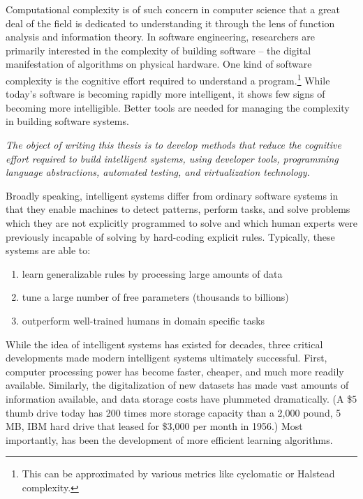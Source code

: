\documentclass[12pt,initial,twoside,maitrise]{dms}
\numberwithin{equation}{section}
\numberwithin{table}{chapter}
\numberwithin{figure}{chapter}
\begin{document}
Computational complexity is of such concern in computer science that a great deal of the field is dedicated to understanding it through the lens of function analysis and information theory. In software engineering, researchers are primarily interested in the complexity of building software -- the digital manifestation of algorithms on physical hardware. One kind of software complexity is the cognitive effort required to understand a program.\footnote{This can be approximated by various metrics like cyclomatic or Halstead complexity.} While today’s software is becoming rapidly more intelligent, it shows few signs of becoming more intelligible. Better tools are needed for managing the complexity in building software systems.

\textit{The object of writing this thesis is to develop methods that reduce the cognitive effort required to build intelligent systems, using developer tools, programming language abstractions, automated testing, and virtualization technology.}

Broadly speaking, intelligent systems differ from ordinary software systems in that they enable machines to detect patterns, perform tasks, and solve problems which they are not explicitly programmed to solve and which human experts were previously incapable of solving by hard-coding explicit rules. Typically, these systems are able to:\\
%
\begin{enumerate}
    \item learn generalizable rules by processing large amounts of data
    \item tune a large number of free parameters (thousands to billions)
    \item outperform well-trained humans in domain specific tasks
\end{enumerate}
%
While the idea of intelligent systems has existed for decades, three critical developments made modern intelligent systems ultimately successful. First, computer processing power has become faster, cheaper, and much more readily available. Similarly, the digitalization of new datasets has made vast amounts of information available, and data storage costs have plummeted dramatically. (A \$5 thumb drive today has 200 times more storage capacity than a 2,000 pound, 5 MB, IBM hard drive that leased for \$3,000 per month in 1956.) Most importantly, has been the development of more efficient learning algorithms.
\end{document}

